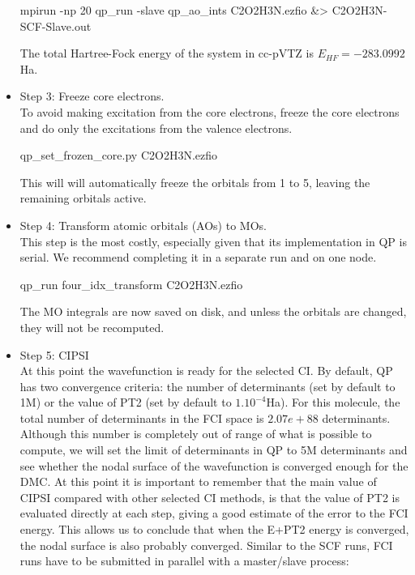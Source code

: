 \begin{itemize}
\begin{shade}
mpirun -np 20 qp_run -slave qp_ao_ints C2O2H3N.ezfio &> C2O2H3N-SCF-Slave.out 
\end{shade}
The total Hartree-Fock energy of the system in cc-pVTZ is \textit{$E_{HF}=-283.0992$}Ha.
\item Step 3: Freeze core electrons.\\
To avoid making excitation from the core electrons, freeze the core electrons and do only the excitations from the valence electrons.\\  
\begin{shade}
qp_set_frozen_core.py C2O2H3N.ezfio
\end{shade}
This will will automatically freeze the orbitals from 1 to 5, leaving the remaining orbitals active. \\
\item Step 4: Transform atomic orbitals (AOs) to MOs. \\
This step is the most costly, especially given that its implementation in QP is serial. We recommend completing it in a separate run and on one node.\\
\begin{shade}
qp_run four_idx_transform C2O2H3N.ezfio
\end{shade}

The MO integrals are now saved on disk, and unless the orbitals are changed, they will not be recomputed.
\item Step 5: CIPSI \\
At this point the wavefunction is ready for the selected CI. By default, QP has two convergence criteria: the number of determinants (set by default to 1M) or the value of PT2 (set by default to $1.10^{-4}$Ha). For this molecule, the total number of determinants in the FCI space is $2.07e+88$ determinants. Although this number is completely out of range of what is possible to compute, we will set the limit of determinants in QP to 5M determinants and see whether the nodal surface of the wavefunction is converged enough for the DMC. At this point it is important to remember that the main value of CIPSI compared with other selected CI methods, is that the value of PT2 is evaluated directly at each step, giving a good estimate of the error to the FCI energy. This allows us to conclude that when the E+PT2 energy is converged, the nodal surface is also probably  converged. Similar to the SCF runs, FCI runs have to be submitted in parallel with a master/slave process:\\


\end{itemize}
